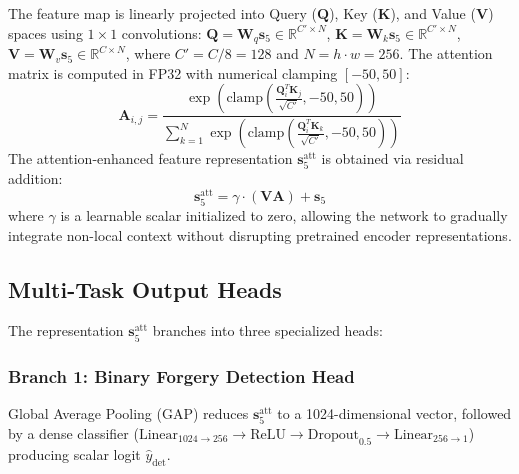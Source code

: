 \documentclass[runningheads]{llncs}
\begin{document}
The feature map is linearly projected into Query ($\mathbf{Q}$), Key ($\mathbf{K}$), and Value ($\mathbf{V}$) spaces using $1 \times 1$ convolutions: $\mathbf{Q} = \mathbf{W}_q \mathbf{s}_5 \in \mathbb{R}^{C' \times N}$, $\mathbf{K} = \mathbf{W}_k \mathbf{s}_5 \in \mathbb{R}^{C' \times N}$, $\mathbf{V} = \mathbf{W}_v \mathbf{s}_5 \in \mathbb{R}^{C \times N}$, where $C' = C / 8 = 128$ and $N = h \cdot w = 256$. The attention matrix is computed in FP32 with numerical clamping $[-50, 50]$:
\begin{equation}
\mathbf{A}_{i, j} = \frac{\exp\left(\text{clamp}\left(\frac{\mathbf{Q}_i^T \mathbf{K}_j}{\sqrt{C'}}, -50, 50\right)\right)}{\sum_{k=1}^N \exp\left(\text{clamp}\left(\frac{\mathbf{Q}_i^T \mathbf{K}_k}{\sqrt{C'}}, -50, 50\right)\right)}\label{eq_attn_matrix}
\end{equation}
The attention-enhanced feature representation $\mathbf{s}_5^{\text{att}}$ is obtained via residual addition:
\begin{equation}
\mathbf{s}_5^{\text{att}} = \gamma \cdot (\mathbf{V} \mathbf{A}) + \mathbf{s}_5\label{eq_attn_res}
\end{equation}
where $\gamma$ is a learnable scalar initialized to zero, allowing the network to gradually integrate non-local context without disrupting pretrained encoder representations.

\subsection{Multi-Task Output Heads}\label{subsec4_4}
The representation $\mathbf{s}_5^{\text{att}}$ branches into three specialized heads:

\subsubsection{Branch 1: Binary Forgery Detection Head}
Global Average Pooling (GAP) reduces $\mathbf{s}_5^{\text{att}}$ to a 1024-dimensional vector, followed by a dense classifier ($\text{Linear}_{1024 \rightarrow 256} \rightarrow \text{ReLU} \rightarrow \text{Dropout}_{0.5} \rightarrow \text{Linear}_{256 \rightarrow 1}$) producing scalar logit $\hat{y}_{\text{det}}$.
\end{document}
